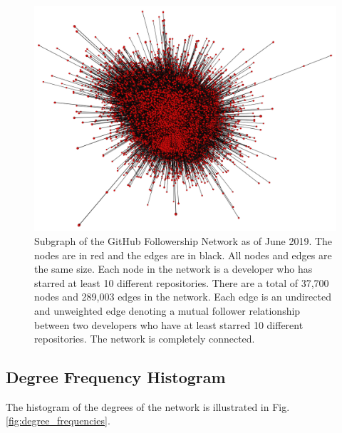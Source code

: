 \documentclass[9pt,twocolumn,twoside]{pnas-new}
\begin{document}
\begin{figure}
\centering
\includegraphics[width=.8\linewidth]{network_visualization}
\caption{Subgraph of the GitHub Followership Network as of June 2019. The nodes are in red and the edges are in black. All nodes and edges are the same size. Each node in the network is a developer who has starred at least 10 different repositories. There are a total of 37,700 nodes and 289,003 edges in the network. Each edge is an undirected and unweighted edge denoting a mutual follower relationship between two developers who have at least starred 10 different repositories. The network is completely connected.
}
\label{fig:network_visualization}
\end{figure}

\subsection{Degree Frequency Histogram} The histogram of the degrees of the network is illustrated in Fig. \ref{fig:degree_frequencies}.
\end{document}
